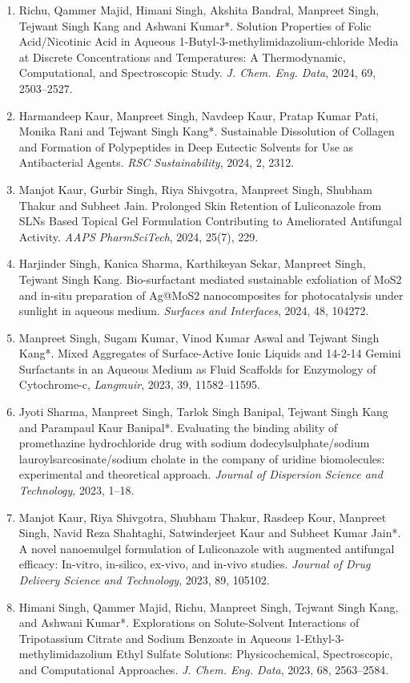 \documentclass[11pt,a4paper]{article}
\begin{document}
\begin{enumerate}[leftmargin=*,label=\arabic*.,itemsep=5pt]
\item Richu, Qammer Majid, Himani Singh, Akshita Bandral, Manpreet Singh, Tejwant Singh Kang and Ashwani Kumar*. Solution Properties of Folic Acid/Nicotinic Acid in Aqueous 1-Butyl-3-methylimidazolium-chloride Media at Discrete Concentrations and Temperatures: A Thermodynamic, Computational, and Spectroscopic Study. \textit{J. Chem. Eng. Data}, 2024, 69, 2503--2527.
\item Harmandeep Kaur, Manpreet Singh, Navdeep Kaur, Pratap Kumar Pati, Monika Rani and Tejwant Singh Kang*. Sustainable Dissolution of Collagen and Formation of Polypeptides in Deep Eutectic Solvents for Use as Antibacterial Agents. \textit{RSC Sustainability}, 2024, 2, 2312.
\item Manjot Kaur, Gurbir Singh, Riya Shivgotra, Manpreet Singh, Shubham Thakur and Subheet Jain. Prolonged Skin Retention of Luliconazole from SLNs Based Topical Gel Formulation Contributing to Ameliorated Antifungal Activity. \textit{AAPS PharmSciTech}, 2024, 25(7), 229.
\item Harjinder Singh, Kanica Sharma, Karthikeyan Sekar, Manpreet Singh, Tejwant Singh Kang. Bio-surfactant mediated sustainable exfoliation of MoS2 and in-situ preparation of Ag@MoS2 nanocomposites for photocatalysis under sunlight in aqueous medium. \textit{Surfaces and Interfaces}, 2024, 48, 104272.
\item Manpreet Singh, Sugam Kumar, Vinod Kumar Aswal and Tejwant Singh Kang*. Mixed Aggregates of Surface-Active Ionic Liquids and 14-2-14 Gemini Surfactants in an Aqueous Medium as Fluid Scaffolds for Enzymology of Cytochrome-c, \textit{Langmuir}, 2023, 39, 11582--11595.
\item Jyoti Sharma, Manpreet Singh, Tarlok Singh Banipal, Tejwant Singh Kang and Parampaul Kaur Banipal*. Evaluating the binding ability of promethazine hydrochloride drug with sodium dodecylsulphate/sodium lauroylsarcosinate/sodium cholate in the company of uridine biomolecules: experimental and theoretical approach. \textit{Journal of Dispersion Science and Technology}, 2023, 1--18.
\item Manjot Kaur, Riya Shivgotra, Shubham Thakur, Rasdeep Kour, Manpreet Singh, Navid Reza Shahtaghi, Satwinderjeet Kaur and Subheet Kumar Jain*. A novel nanoemulgel formulation of Luliconazole with augmented antifungal efficacy: In-vitro, in-silico, ex-vivo, and in-vivo studies. \textit{Journal of Drug Delivery Science and Technology}, 2023, 89, 105102.
\item Himani Singh, Qammer Majid, Richu, Manpreet Singh, Tejwant Singh Kang, and Ashwani Kumar*. Explorations on Solute-Solvent Interactions of Tripotassium Citrate and Sodium Benzoate in Aqueous 1-Ethyl-3-methylimidazolium Ethyl Sulfate Solutions: Physicochemical, Spectroscopic, and Computational Approaches. \textit{J. Chem. Eng. Data}, 2023, 68, 2563--2584.

\end{enumerate}
\end{document}
